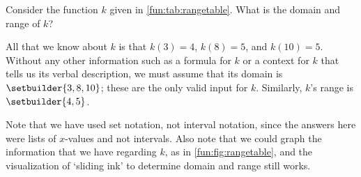 \begin{pccexample}
Consider the function $k$ given in \cref{fun:tab:rangetable}. What is the domain and range of $k$? 
\begin{pccsolution}
All that we know about $k$ is that $k(3)=4$, $k(8)=5$, and $k(10)=5$. Without any other information such as a formula for $k$ or a context for $k$ that tells us its verbal description, we must assume that its domain is $\setbuilder{3,8,10}$; these are the only valid input for $k$. Similarly, $k$'s range is $\setbuilder{4,5}$.
\end{pccsolution}
Note that we have used set notation, not interval notation, since the answers here were lists of $x$-values and not intervals. Also note that we could graph the information that we have regarding $k$, as in \cref{fun:fig:rangetable}, and the visualization of `sliding ink' to determine domain and range still works.
\end{pccexample}

